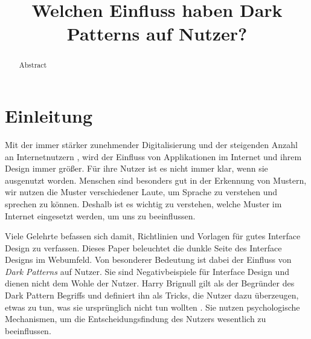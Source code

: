 \documentclass[conference,compsoc,final,a4paper]{IEEEtran}
\newcommand{\autoren}[0]{Karhan, Marvin}
\newcommand{\dokumententitel}[0]{Welchen Einfluss haben Dark Patterns auf Nutzer?}
\begin{document}
\title{\dokumententitel}

\author{
  \IEEEauthorblockN{\autoren}
}

\maketitle
\thispagestyle{plain}
\pagestyle{plain}


\begin{abstract}
  Abstract
\end{abstract}

{\small\tableofcontents}

\section{Einleitung}
Mit der immer stärker zunehmender Digitalisierung und der steigenden Anzahl an Internetnutzern \autocite{ITU2020}, wird der Einfluss von Applikationen im Internet und ihrem Design immer größer. Für ihre Nutzer ist es nicht immer klar, wenn sie ausgenutzt worden. Menschen sind besonders gut in der Erkennung von Mustern, wir nutzen die Muster verschiedener Laute, um Sprache zu verstehen und sprechen zu können. Deshalb ist es wichtig zu verstehen, welche Muster im Internet eingesetzt werden, um uns zu beeinflussen.

Viele Gelehrte befassen sich damit, Richtlinien und Vorlagen für gutes Interface Design zu verfassen. Dieses Paper beleuchtet die dunkle Seite des Interface Designs im Webumfeld. Von besonderer Bedeutung ist dabei der Einfluss von \textit{Dark Patterns} auf Nutzer. Sie sind Negativbeispiele für Interface Design und dienen nicht dem Wohle der Nutzer. Harry Brignull gilt als der Begründer des Dark Pattern Begriffs und definiert ihn als Tricks, die Nutzer dazu überzeugen, etwas zu tun, was sie ursprünglich nicht tun wollten \autocite{Brignull}. Sie nutzen psychologische Mechanismen, um die Entscheidungsfindung des Nutzers wesentlich zu beeinflussen.
\end{document}
